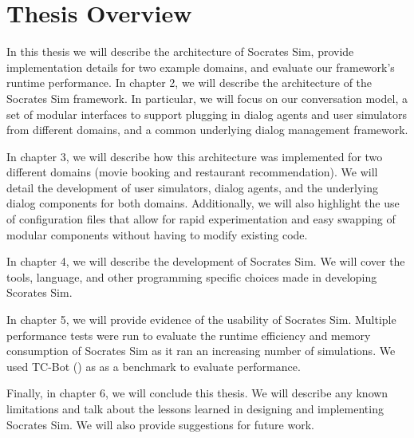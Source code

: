 \section{Thesis Overview}

In this thesis we will describe the architecture of Socrates Sim, provide implementation details for two example domains, and evaluate our framework's runtime performance. In chapter 2, we will describe the architecture of the Socrates Sim framework. In particular, we will focus on our conversation model, a set of modular interfaces to support plugging in dialog agents and user simulators from different domains, and a common underlying dialog management framework. 

In chapter 3, we will describe how this architecture was implemented for two different domains (movie booking and restaurant recommendation). We will detail the development of user simulators, dialog agents, and the underlying dialog components for both domains. Additionally, we will also highlight the use of configuration files that allow for rapid experimentation and easy swapping of modular components without having to modify existing code. 

In chapter 4, we will describe the development of Socrates Sim. We will cover the tools, language, and other programming specific choices made in developing Scorates Sim. 

In chapter 5, we will provide evidence of the usability of Socrates Sim. Multiple performance tests were run to evaluate the runtime efficiency and memory consumption of Socrates Sim as it ran an increasing number of simulations. We used TC-Bot (\cite{li_end_to_end}) as as a benchmark to evaluate performance. 

Finally, in chapter 6, we will conclude this thesis. We will describe any known limitations and talk about the lessons learned in designing and implementing Socrates Sim. We will also provide suggestions for future work.

